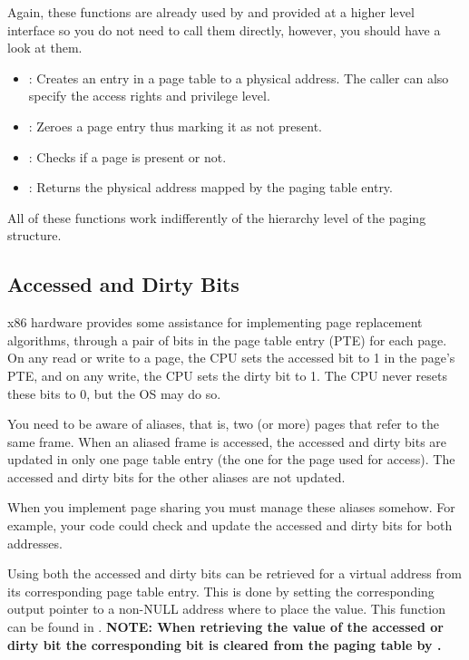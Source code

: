 \begin{appendices}
Again, these functions are already used by \projectname and provided at a higher level interface so
you do not need to call them directly, however, you should have a look at them.

\begin{itemize}
	\item {}: Creates an entry in a page table to a physical address. The caller can also
specify the access rights and privilege level.

	\item {}: Zeroes a page entry thus marking it as not present.

	\item {}: Checks if a page is present or not.

	\item {}: Returns the physical address mapped by the paging table
entry.
\end{itemize}

All of these functions work indifferently of the hierarchy level of the paging structure.

\subsection{Accessed and Dirty Bits}
\label{sect:ADBits}

x86 hardware provides some assistance for implementing page replacement algorithms, through a pair
of bits in the page table entry (PTE) for each page. On any read or write to a page, the CPU sets
the accessed bit to 1 in the page’s PTE, and on any write, the CPU sets the dirty bit to 1. The CPU
never resets these bits to 0, but the OS may do so.

You need to be aware of aliases, that is, two (or more) pages that refer to the same frame. When an
aliased frame is accessed, the accessed and dirty bits are updated in only one page table entry (the
one for the page used for access). The accessed and dirty bits for the other aliases are not updated.

When you implement page sharing you must manage these aliases somehow. For example, your code could
check and update the accessed and dirty bits for both addresses.

Using  both the accessed and dirty bits can be retrieved for a virtual
address from its corresponding page table entry. This is done by setting the corresponding output
pointer to a non-NULL address where to place the value. This function can be found in .
\textbf{NOTE: When retrieving the value of the accessed or dirty bit the corresponding bit is
cleared from the paging table by \projectname.}


\end{appendices}
